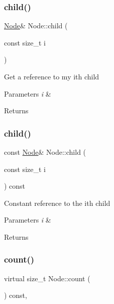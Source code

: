 \subsubsection{\texorpdfstring{child()}{child()}\hspace{0.1cm}{\footnotesize\ttfamily [1/2]}}
{\footnotesize\ttfamily \hyperlink{class_node}{Node}\& Node\+::child (\begin{DoxyParamCaption}\item[{const size\+\_\+t}]{i }\end{DoxyParamCaption})\hspace{0.3cm}{\ttfamily [inline]}}

Get a reference to my i\textquotesingle{}th child 
\begin{DoxyParams}{Parameters}
{\em i} & \\
\hline
\end{DoxyParams}
\begin{DoxyReturn}{Returns}

\end{DoxyReturn}
\mbox{\label{class_node_acc2b20cdba470853f1c137e26546ed3c}} 
\subsubsection{\texorpdfstring{child()}{child()}\hspace{0.1cm}{\footnotesize\ttfamily [2/2]}}
{\footnotesize\ttfamily const \hyperlink{class_node}{Node}\& Node\+::child (\begin{DoxyParamCaption}\item[{const size\+\_\+t}]{i }\end{DoxyParamCaption}) const\hspace{0.3cm}{\ttfamily [inline]}}

Constant reference to the i\textquotesingle{}th child 
\begin{DoxyParams}{Parameters}
{\em i} & \\
\hline
\end{DoxyParams}
\begin{DoxyReturn}{Returns}

\end{DoxyReturn}
\mbox{\label{class_node_abd387b27e1deb45b789ad7b7abd8c6e6}} 
\subsubsection{\texorpdfstring{count()}{count()}\hspace{0.1cm}{\footnotesize\ttfamily [1/2]}}
{\footnotesize\ttfamily virtual size\+\_\+t Node\+::count (\begin{DoxyParamCaption}{ }\end{DoxyParamCaption}) const\hspace{0.3cm}{\ttfamily [inline]}, {\ttfamily [virtual]}}

